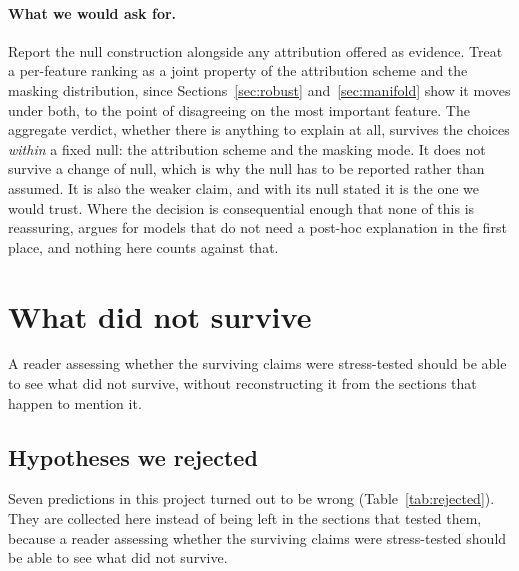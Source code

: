 \documentclass[10pt,twocolumn]{article}
\begin{document}
\paragraph{What we would ask for.}
Report the null construction alongside any attribution offered as evidence.
Treat a per-feature ranking as a joint property of the attribution scheme and
the masking distribution, since Sections~\ref{sec:robust}
and~\ref{sec:manifold} show it moves under both, to the point of disagreeing on
the most important feature. The aggregate verdict, whether there is anything to
explain at all, survives the choices \emph{within} a fixed null: the attribution
scheme and the masking mode. It does not survive a change of null, which is why
the null has to be reported rather than assumed. It is also the weaker claim,
and with its null stated it is the one we would trust. Where the decision is consequential enough that none
of this is reassuring, \citet{rudin2019stop} argues for models that do not need
a post-hoc explanation in the first place, and nothing here counts against
that.

\section{What did not survive}

A reader assessing whether the surviving claims were stress-tested should be
able to see what did not survive, without reconstructing it from the sections
that happen to mention it.

\subsection{Hypotheses we rejected}
\label{sec:rejected}

Seven predictions in this project turned out to be wrong
(Table~\ref{tab:rejected}). They are collected here instead of being left in the
sections that tested them, because a reader assessing whether the surviving
claims were stress-tested should be able to see what did not survive.
\end{document}
